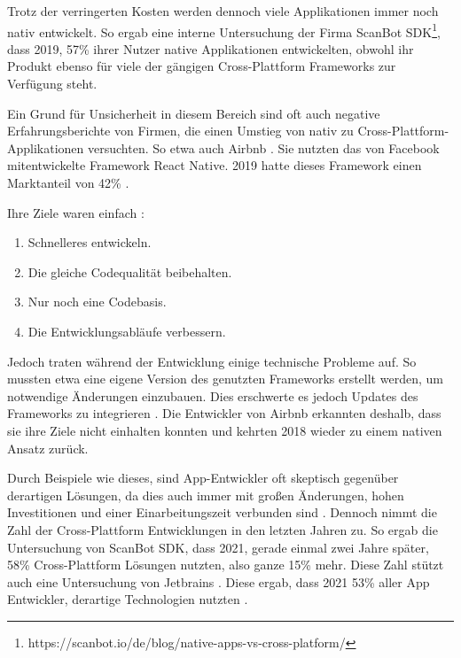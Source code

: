 Trotz der verringerten Kosten werden dennoch viele Applikationen immer noch nativ entwickelt. So ergab eine interne Untersuchung der Firma ScanBot SDK\footnote{https://scanbot.io/de/blog/native-apps-vs-cross-platform/}, dass 2019, 57\% ihrer Nutzer native Applikationen entwickelten, obwohl ihr Produkt ebenso für viele der gängigen Cross-Plattform Frameworks zur Verfügung steht.

Ein Grund für Unsicherheit in diesem Bereich sind oft auch negative Erfahrungsberichte von Firmen, die einen Umstieg von nativ zu Cross-Plattform-Applikationen versuchten.  So etwa auch Airbnb \cite{Airbnb_react_goals}. Sie nutzten das von Facebook mitentwickelte Framework React Native. 2019 hatte dieses Framework einen Marktanteil von 42\% \cite{statist_CP_Framework}. 

Ihre Ziele waren einfach \cite{statist_CP_Framework}:
\begin{enumerate}%
    \item Schnelleres entwickeln.
    \item Die gleiche Codequalität beibehalten.
    \item Nur noch eine Codebasis.
    \item Die Entwicklungsabläufe verbessern.
\end{enumerate}
Jedoch traten während der Entwicklung einige technische Probleme auf. So mussten etwa eine eigene Version des genutzten Frameworks erstellt werden, um notwendige Änderungen einzubauen. Dies erschwerte es jedoch Updates des Frameworks zu integrieren \cite{Airbnb_technology}. Die Entwickler von Airbnb erkannten deshalb, dass sie ihre Ziele nicht einhalten konnten und kehrten 2018 wieder zu einem nativen Ansatz zurück.

Durch Beispiele wie dieses, sind App-Entwickler oft skeptisch gegenüber derartigen Lösungen, da dies auch immer mit großen Änderungen, hohen Investitionen und einer  Einarbeitungszeit verbunden sind \cite{medium_Lehtimäki}. Dennoch nimmt die Zahl der Cross-Plattform Entwicklungen in den letzten Jahren zu. So ergab die Untersuchung von ScanBot SDK, dass 2021, gerade einmal zwei Jahre später, 58\% Cross-Plattform Lösungen nutzten, also ganze 15\% mehr. Diese Zahl stützt auch eine Untersuchung von Jetbrains \cite{JetBrains_miscellaneous_2021}. Diese ergab, dass 2021 53\% aller App Entwickler, derartige Technologien nutzten .

